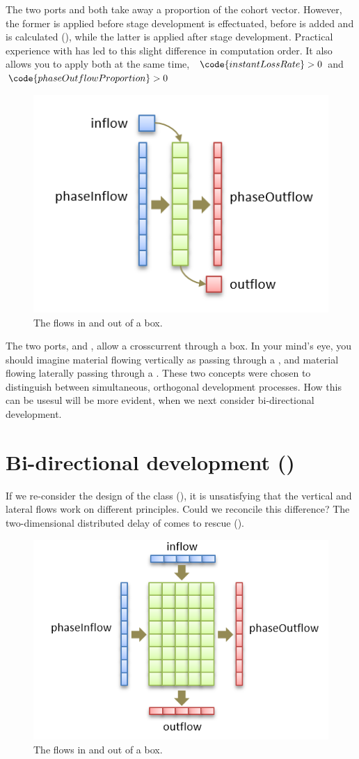 The two ports  and  both take away a proportion of the cohort vector. However, the former is applied before stage development is effectuated, \ie before  is added and  is calculated (), while the latter is applied after stage development. Practical experience with  has led to this slight difference in computation order. It also allows you to apply both at the same time, \ie\ $\code{instantLossRate}>0$ and $\code{phaseOutflowProportion}>0$

\begin{figure} [ht]
\centering
\includegraphics[width=.5\textwidth]{graphics/phys-dev-stage}
\caption{The flows in and out of a  box.}
\label{fig:phys-dev-stage}
\end{figure}

The two ports,  and , allow a crosscurrent through a  box. In your mind's eye, you should imagine material flowing vertically as passing through a , and material flowing laterally passing through a . These two concepts were chosen to distinguish between simultaneous, orthogonal development processes. How this can be usesul will be more evident, when we next consider bi-directional development.

\FloatBarrier
\section{Bi-directional development ()}

If we re-consider the design of the  class (), it is unsatisfying that the vertical and lateral flows work on different principles. Could we reconcile this difference? The two-dimensional distributed delay of \citet{Larkin00} comes to rescue ().

\begin{figure} [ht]
\centering
\includegraphics[width=.5\textwidth]{graphics/phys-dev-stage-2d}
\caption{The flows in and out of a  box.}
\label{fig:phys-dev-stage-2d}
\end{figure}

